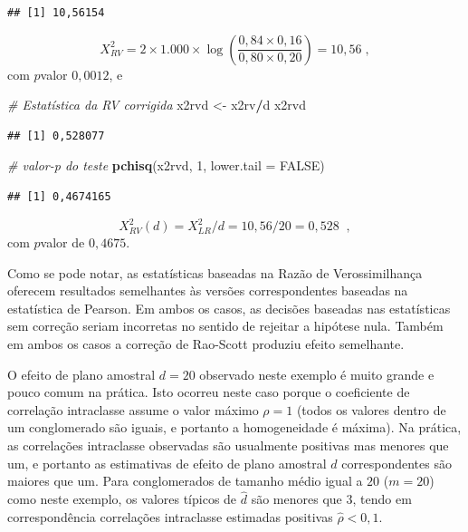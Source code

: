 \documentclass[]{book}
\newenvironment{Shaded}{\begin{snugshade}}{\end{snugshade}}
\newcommand{\KeywordTok}[1]{\textcolor[rgb]{0.13,0.29,0.53}{\textbf{#1}}}
\newcommand{\DataTypeTok}[1]{\textcolor[rgb]{0.13,0.29,0.53}{#1}}
\newcommand{\DecValTok}[1]{\textcolor[rgb]{0.00,0.00,0.81}{#1}}
\newcommand{\StringTok}[1]{\textcolor[rgb]{0.31,0.60,0.02}{#1}}
\newcommand{\CommentTok}[1]{\textcolor[rgb]{0.56,0.35,0.01}{\textit{#1}}}
\newcommand{\OtherTok}[1]{\textcolor[rgb]{0.56,0.35,0.01}{#1}}
\newcommand{\OperatorTok}[1]{\textcolor[rgb]{0.81,0.36,0.00}{\textbf{#1}}}
\newcommand{\NormalTok}[1]{#1}
\theoremstyle{definition}
\theoremstyle{definition}
\theoremstyle{definition}
\theoremstyle{remark}
\begin{document}
\begin{verbatim}
## [1] 10,56154
\end{verbatim}

\[
X_{RV}^{2}=2\times 1.000\times \log \left( \frac{0,84\times 0,16}{0,80\times
0,20}\right) =10,56\;, 
\] com \(p\)valor \(0,0012\), e

\begin{Shaded}
\begin{Highlighting}[]
\CommentTok{# Estatística da RV corrigida}
\NormalTok{x2rvd <-}\StringTok{ }\NormalTok{x2rv}\OperatorTok{/}\NormalTok{d}
\NormalTok{x2rvd}
\end{Highlighting}
\end{Shaded}

\begin{verbatim}
## [1] 0,528077
\end{verbatim}

\begin{Shaded}
\begin{Highlighting}[]
\CommentTok{# valor-p do teste}
\KeywordTok{pchisq}\NormalTok{(x2rvd, }\DecValTok{1}\NormalTok{, }\DataTypeTok{lower.tail =} \OtherTok{FALSE}\NormalTok{)}
\end{Highlighting}
\end{Shaded}

\begin{verbatim}
## [1] 0,4674165
\end{verbatim}

\[
X_{RV}^{2}(d)=X_{LR}^{2}/d=10,56/20=0,528\;\;, 
\] com \(p\)valor de \(0,4675\).

Como se pode notar, as estatísticas baseadas na Razão de Verossimilhança
oferecem resultados semelhantes às versões correspondentes baseadas na
estatística de Pearson. Em ambos os casos, as decisões baseadas nas
estatísticas sem correção seriam incorretas no sentido de rejeitar a
hipótese nula. Também em ambos os casos a correção de Rao-Scott produziu
efeito semelhante.

O efeito de plano amostral \(d=20\) observado neste exemplo é muito
grande e pouco comum na prática. Isto ocorreu neste caso porque o
coeficiente de correlação intraclasse assume o valor máximo \(\rho =1\)
(todos os valores dentro de um conglomerado são iguais, e portanto a
homogeneidade é máxima). Na prática, as correlações intraclasse
observadas são usualmente positivas mas menores que um, e portanto as
estimativas de efeito de plano amostral \(\widehat{d}\) correspondentes
são maiores que um. Para conglomerados de tamanho médio igual a \(20\)
(\(m=20\)) como neste exemplo, os valores típicos de \(\widehat{d}\) são
menores que \(3\), tendo em correspondência correlações intraclasse
estimadas positivas \(\widehat{\rho }<0,1\).
\end{document}

